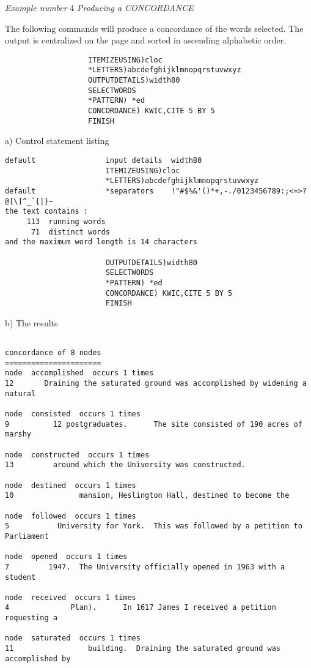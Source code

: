 \newpage
 {\em Example number} 4                    {\em Producing a CONCORDANCE}

The following commands will produce a concordance of the words selected.
The output is centralized on the page and sorted in ascending alphabetic order.
\begin{verbatim}
                   ITEMIZEUSING)cloc
                   *LETTERS)abcdefghijklmnopqrstuvwxyz
                   OUTPUTDETAILS)width80
                   SELECTWORDS
                   *PATTERN) *ed
                   CONCORDANCE) KWIC,CITE 5 BY 5
                   FINISH
\end{verbatim}
                      a)   Control statement listing
\begin{verbatim}
default                input details  width80
                       ITEMIZEUSING)cloc
                       *LETTERS)abcdefghijklmnopqrstuvwxyz
default                *separators    !"#$%&'()*+,-./0123456789:;<=>?@[\]^_`{|}~
the text contains :
     113  running words
      71  distinct words
and the maximum word length is 14 characters

                       OUTPUTDETAILS)width80
                       SELECTWORDS
                       *PATTERN) *ed
                       CONCORDANCE) KWIC,CITE 5 BY 5
                       FINISH
\end{verbatim}

                     b)   The results
\begin{verbatim}

concordance of 8 nodes
======================
node  accomplished  occurs 1 times
12       Draining the saturated ground was accomplished by widening a natural 

node  consisted  occurs 1 times
9          12 postgraduates.      The site consisted of 190 acres of marshy 

node  constructed  occurs 1 times
13         around which the University was constructed. 

node  destined  occurs 1 times
10               mansion, Heslington Hall, destined to become the 

node  followed  occurs 1 times
5           University for York.  This was followed by a petition to Parliament

node  opened  occurs 1 times
7         1947.  The University officially opened in 1963 with a student 

node  received  occurs 1 times
4              Plan).      In 1617 James I received a petition requesting a 

node  saturated  occurs 1 times
11                 building.  Draining the saturated ground was accomplished by
\end{verbatim}

